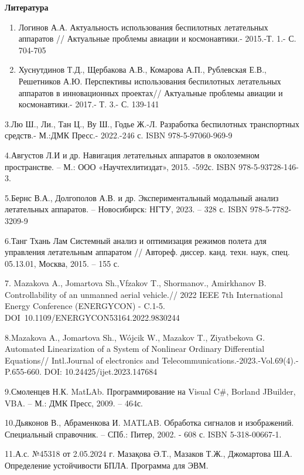 {\bfseries Литература}

\begin{enumerate}
\def\labelenumi{\arabic{enumi}.}
\item
  Логинов А.А. Актуальность использования беспилотных летательных
  аппаратов // Актуальные проблемы авиации и космонавтики.- 2015.-Т. 1.-
  С. 704-705
\item
  Хуснутдинов Т.Д., Щербакова А.В., Комарова А.П., Рублевская Е.В.,
  Решетников А.Ю. Перспективы использования беспилотных летательных
  аппаратов в инновационных проектах// Актуальные проблемы авиации и
  космонавтики.- 2017.- Т. 3.- С. 139-141
\end{enumerate}

3.Лю Ш., Ли., Тан Ц., Ву Ш., Годье Ж.-Л. Разработка беспилотных
транспортных средств.- М.:ДМК Пресс.- 2022.-246 с. ISBN
978-5-97060-969-9

4.Августов Л.И и др. Навигация летательных аппаратов в околоземном
пространстве. -- М.: ООО «Научтехлитиздат», 2015. -592с. ISBN
978-5-93728-146-3.

5.Бернс В.А., Долгополов А.В. и др. Экспериментальный модальный анализ
летательных аппаратов. -- Новосибирск: НГТУ, 2023. -- 328 с. ISBN
978-5-7782-3209-9

6.Танг Тхань Лам Системный анализ и оптимизация режимов полета для
управления летательным аппаратом // Автореф. диссер. канд. техн. наук,
спец. 05.13.01, Москва, 2015. -- 155 с.

7. Mazakova A., Jomartova Sh.,Vfzakov T., Shormanov., Amirkhanov B.
Controllability of an unmanned aerial vehicle.// 2022 IEEE 7th
International Energy Conference (ENERGYCON) - C.1-5.
DOI~10.1109/ENERGYCON53164.2022.9830244

8.Mazakova A., Jomartova Sh., Wójcik W., Mazakov T., Ziyatbekova G.
Automated Linearization of a System of Nonlinear Ordinary Differential
Equations// Intl.Journal of electronics and
Telecommunications.-2023.-Vol.69(4).- P.655-660. DOI:
10.24425/ijet.2023.147684

9.Смоленцев Н.К. MatLAb. Программирование на Visual C\#, Borland
JBuilder, VBA. -- М.: ДМК Пресс, 2009. -- 464с.

10.Дьяконов В., Абраменкова И. MATLAB. Обработка сигналов и изображений.
Специальный справочник. -- СПб.: Питер, 2002. - 608 с. ISBN
5-318-00667-1.

11.А.с. №45318 от 2.05.2024 г. Мазақова Ә.Т., Мазаков Т.Ж., Джомартова
Ш.А. Определение устойчивости БПЛА. Программа для ЭВМ.

